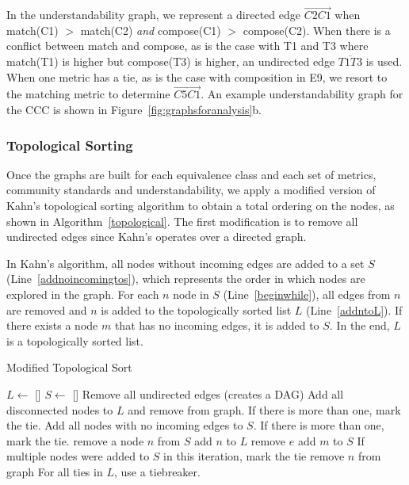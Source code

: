 In the understandability graph, we represent a directed edge  $\overrightarrow{C2C1}$ when match(C1) $>$ match(C2) \emph{and} compose(C1) $>$ compose(C2). When there is a conflict between match and compose, as is the case with T1 and T3 where match(T1) is higher but compose(T3) is higher, an undirected edge $\overline{T1T3}$ is used. When one metric has a tie, as is the case with composition in E9, we resort to the matching metric to determine  $\overrightarrow{C5C1}$. An example understandability graph for the CCC is shown in Figure~\ref{fig:graphsforanalysis}b.

\subsubsection{Topological Sorting}
Once the graphs are built for each equivalence class and each set of metrics, community standards and understandability, we apply a modified version of Kahn's topological sorting algorithm to obtain a total ordering on the nodes, as shown in Algorithm~\ref{topological}. The first modification is to remove all undirected edges since Kahn's operates over a directed graph.

In Kahn's algorithm, all nodes without incoming edges are added to a set $S$ (Line~\ref{addnoincomingtos}), which represents the order in which nodes are explored in the graph. For each $n$ node in $S$ (Line~\ref{beginwhile}), all edges from $n$ are removed and $n$ is added to the topologically sorted list $L$ (Line~\ref{addntoL}). If there exists a node $m$ that has no incoming edges, it is added to $S$.  In the end, $L$ is a topologically sorted list.

\begin{algorithm}
  \caption{Modified Topological Sort}\label{topological}
  \begin{algorithmic}[1]
\State  $L \gets$ []
\State $S \gets$ []
\State Remove all undirected edges (creates a DAG)
\State Add all disconnected nodes to $L$ and remove from graph. If there is more than one, mark the tie. \label{markTie1}
\State Add all nodes with no incoming edges to $S$. If there is more than one, mark the tie. \label{addnoincomingtos}
 \label{beginwhile}
    \State remove a node $n$ from $S$ \label{setn}
    \State add $n$ to $L$  \label{addntoL}
        \State remove $e$
            \State add $m$ to $S$ \label{addToS}
        \EndIf
    \EndFor
    \State If multiple nodes were added to $S$ in this iteration, mark the tie \label{markTie2}
    \State remove $n$ from graph
\EndWhile
\State For all ties in $L$, use a tiebreaker.
  \end{algorithmic}
\end{algorithm}

